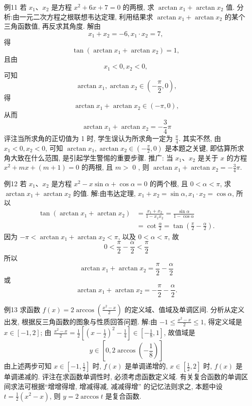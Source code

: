 例11 若 $x_1 、 x_2$ 是方程 $x^2+6 x+7=0$ 的两根, 求 $\arctan x_1+\arctan x_2$ 值.
分析:由一元二次方程之根联想韦达定理, 利用结果求 $\arctan x_1+ \arctan x_2$ 的某个三角函数值, 再反求其角度.
解由
$$
x_1+x_2=-6, x_1 \cdot x_2=7 \text {, }
$$
得
$$
\tan \left(\arctan x_1+\arctan x_2\right)=1 \text {, }
$$
且由
$$
x_1<0, x_2<0 \text {, }
$$
可知
$$
\arctan x_1, \arctan x_2 \in\left(-\frac{\pi}{2}, 0\right),
$$
得
$$
\arctan x_1+\arctan x_2 \in(-\pi, 0),
$$
从而
$$
\arctan x_1+\arctan x_2=-\frac{3}{4} \pi
$$
评注当所求角的正切值为 1 时, 学生误认为所求角一定为 $\frac{\pi}{4}$. 其实不然, 由 $x_1<0, x_2<0$, 可知 $\arctan x_1, \arctan x_2 \in\left(-\frac{\pi}{2}, 0\right)$ 是本题之关键, 即估算所求角大致在什么范围, 是引起学生警惕的重要步骤.
推广: 当 $x_1 、 x_2$ 是关于 $x$ 的方程 $x^2+m x+(m+1)=0$ 的两根, 且 $m>$ 0 , 则 $\arctan x_1+\arctan x_2=-\frac{3}{4} \pi$.



例12 若 $x_1 、 x_2$ 是方程 $x^2-x \sin \alpha+\cos \alpha=0$ 的两个根, 且 $0<\alpha<\pi$, 求 $\arctan x_1+\arctan x_2$ 的值.
解:由韦达定理, $x_1+x_2=\sin \alpha, x_1 \cdot x_2=\cos \alpha$, 所以
$$
\begin{aligned}
\tan \left(\arctan x_1+\arctan x_2\right) & =\frac{x_1+x_2}{1-x_1 x_2}=\frac{\sin \alpha}{1-\cos \alpha} \\
& =\cot \frac{\alpha}{2}=\tan \left(\frac{\pi}{2}-\frac{\alpha}{2}\right) .
\end{aligned}
$$
因为 $-\pi<\arctan x_1+\arctan x_2<\pi$, 以及 $0<\alpha<\pi$, 故
$$
0<\frac{\pi}{2}-\frac{\alpha}{2}<\frac{\pi}{2}
$$
所以
$$
\arctan x_1+\arctan x_2=\frac{\pi}{2}-\frac{\alpha}{2}
$$
或
$$
\arctan x_1+\arctan x_2=-\frac{\pi}{2}-\frac{\alpha}{2} .
$$



例13 求函数 $f(x)=2 \arccos \left(\frac{x^2-x}{2}\right)$ 的定义域、值域及单调区间.
分析从定义出发, 根据反三角函数的图象与性质回答问题.
解:由 $-1 \leqslant \frac{x^2-x}{2} \leqslant 1$, 得定义域是 $x \in[-1,2]$;
由 $\frac{x^2-x}{2}=\frac{1}{2}\left[\left(x-\frac{1}{2}\right)^2-\frac{1}{4}\right] \in\left[-\frac{1}{8}, 1\right]$,
故值域是
$$
y \in\left[0,2 \arccos \left(-\frac{1}{8}\right)\right]
$$
由上述两步可知 $x \in\left[-1, \frac{1}{2}\right]$ 时, $f(x)$ 是单调递增的, $x \in\left[\frac{1}{2}, 2\right]$ 时, $f(x)$ 是单调递减的.
评注在求函数单调性时, 必须考虑函数定义域.
有关复合函数的单调区间求法可根据“增增得增, 增减得减, 减减得增” 的记忆法则求之, 本题中设 $t=\frac{1}{2}\left(x^2-x\right)$, 则 $y=2 \arccos t$ 是复合函数.



